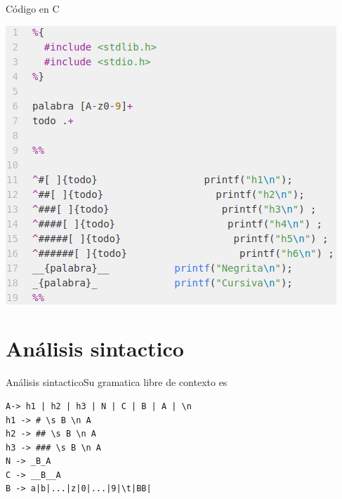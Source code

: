 \documentclass[11pt]{beamer}
\begin{document}
\begin{frame}[fragile]{Código en C}

\begin{center}
\includegraphics[scale=0.55]{imagenes/code.png} 

\end{center}
\end{frame}


\section{Análisis sintactico}

\begin{frame}[fragile]{Análisis sintactico}{Su gramatica libre de contexto es}
\begin{verbatim}
A-> h1 | h2 | h3 | N | C | B | A | \n
h1 -> # \s B \n A
h2 -> ## \s B \n A
h3 -> ### \s B \n A
N -> _B_A
C -> __B__A
B -> a|b|...|z|0|...|9|\t|BB|
\end{verbatim}
\end{frame}
\end{document}
